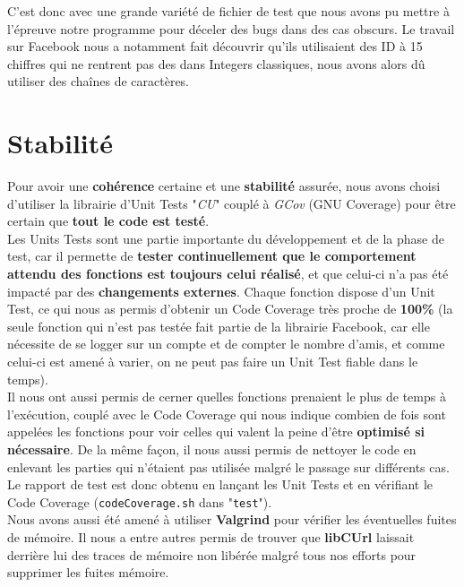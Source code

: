 \documentclass[a4paper, titlepage, oneside]{book}
\begin{document}
C'est donc avec une grande variété de fichier de test que nous avons pu mettre à l'épreuve notre programme pour déceler des bugs dans des cas obscurs. Le travail sur Facebook nous a notamment fait découvrir qu'ils utilisaient des ID à 15 chiffres qui ne rentrent pas des dans Integers classiques, nous avons alors dû utiliser des chaînes de caractères.\\


\section{Stabilité}

Pour avoir une \textbf{cohérence} certaine et une \textbf{stabilité} assurée, nous avons choisi d'utiliser la librairie d'Unit Tests "\emph{CU}" couplé à \emph{GCov} (GNU Coverage) pour être certain que \textbf{tout le code est testé}.\\

Les Units Tests sont une partie importante du développement et de la phase de test, car il permette de \textbf{tester continuellement que le comportement attendu des fonctions est toujours celui réalisé}, et que celui-ci n'a pas été impacté par des \textbf{changements externes}. Chaque fonction dispose d'un Unit Test, ce qui nous as permis d'obtenir un Code Coverage très proche de \textbf{100\%} (la seule fonction qui n'est pas testée fait partie de la librairie Facebook, car elle nécessite de se logger sur un compte et de compter le nombre d'amis, et comme celui-ci est amené à varier, on ne peut pas faire un Unit Test fiable dans le temps).\\

Il nous ont aussi permis de cerner quelles fonctions prenaient le plus de temps à l'exécution, couplé avec le Code Coverage qui nous indique combien de fois sont appelées les fonctions pour voir celles qui valent la peine d'être \textbf{optimisé si nécessaire}. De la même façon, il nous aussi permis de nettoyer le code en enlevant les parties qui n'étaient pas utilisée malgré le passage sur différents cas.\\
Le rapport de test est donc obtenu en lançant les Unit Tests et en vérifiant le Code Coverage (\texttt{codeCoverage.sh} dans "\texttt{test}").\\

Nous avons aussi été amené à utiliser \textbf{Valgrind} pour vérifier les éventuelles fuites de mémoire. Il nous a entre autres permis de trouver que \textbf{libCUrl} laissait derrière lui des traces de mémoire non libérée malgré tous nos efforts pour supprimer les fuites mémoire.\\
\end{document}
